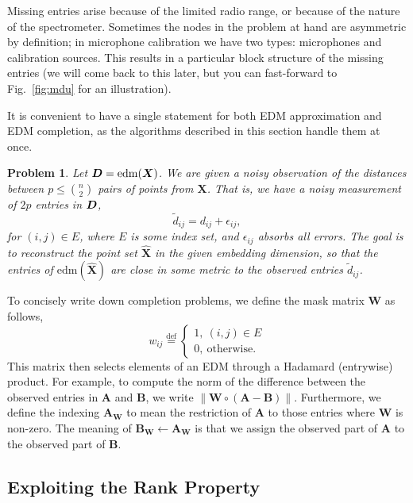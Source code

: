 \documentclass[10pt,double]{IEEEtran}
\newtheorem{problem}{Problem}
\providecommand{\norm}[1]{\left\lVert#1\right\rVert}
\providecommand{\bydef}{\overset{\text{def}}{=}}
\providecommand{\mat}[1]{\ensuremath{\boldsymbol{#1}}}
\providecommand{\wh}[1]{\ensuremath{\widehat{#1}}}
\providecommand{\wt}[1]{\ensuremath{\widetilde{#1}}}
\providecommand{\mA}{\mat{A}} \providecommand{\mB}{\mat{B}}
\providecommand{\mW}{\mat{W}}
\providecommand{\mX}{\mat{X}}\providecommand{\mY}{\mat{Y}}
\newcommand{\EDM}{\ensuremath{\mathrm{edm}}}
\begin{document}
Missing entries arise because of the limited radio range, or because of the
nature of the spectrometer. Sometimes the nodes in the problem at hand are
asymmetric by definition; in microphone calibration we have two types:
microphones and calibration sources. This results in a particular block
structure of the missing entries (we will come back to this later, but you can
fast-forward to Fig.~\ref{fig:mdu} for an illustration).

It is convenient to have a single statement for both EDM approximation and EDM
completion, as the algorithms described in this section handle them at once.

\begin{problem}
\label{prob:approximation_completion}
Let $\mD = \EDM(\mX)$. We are given a noisy observation of the distances
between $p \leq \binom{n}{2}$ pairs of points from $\mX$. That is, we have a
noisy measurement of $2p$ entries in $\mD$,
\begin{equation}
	\wt{d}_{ij} = d_{ij} + \epsilon_{ij},
\end{equation}
for $(i, j) \in E$, where $E$ is some index set, and $\epsilon_{ij}$ absorbs
all errors. The goal is to reconstruct the point set $\wh{\mX}$ in the given
embedding dimension, so that the entries of $\EDM(\wh{\mX})$ are close in some
metric to the observed entries $\wt{d}_{ij}$.
\end{problem}

To concisely write down completion problems, we define the mask matrix $\mW$
as follows,
\begin{equation}
	w_{ij} \bydef
	\begin{cases}
	   1, \ (i, j) \in E \\
	   0, \ \text{otherwise}.
	\end{cases}
\end{equation}
This matrix then selects elements of an EDM through a Hadamard (entrywise)
product. For example, to compute the norm of the difference between the
observed entries in $\mA$ and $\mB$, we write $\norm{\mW \circ (\mA - \mB)}$.
Furthermore, we define the indexing $\mA_{\mW}$ to mean the restriction of
$\mA$ to those entries where $\mW$ is non-zero. The meaning of $\mB_{\mW}
\gets \mA_{\mW}$ is that we assign the observed part of $\mA$ to the observed
part of $\mB$.

\subsection{Exploiting the Rank Property} \label{sub:exploiting_the_rank_property}
\end{document}

